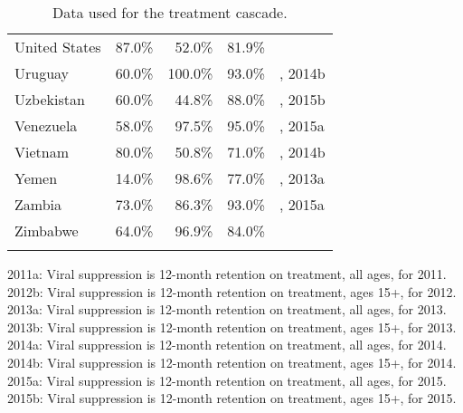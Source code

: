 \begin{longtable}{lrrrl}
 United States & 87.0\% & 52.0\% & 81.9\% & \cite{cdc2012a,cdc2014} \\
  Uruguay & 60.0\% & 100.0\% & 93.0\% & \cite{Unaids2016-an}, 2014b \\
  Uzbekistan & 60.0\% & 44.8\% & 88.0\% & \cite{Unaids2016-an}, 2015b \\
  Venezuela & 58.0\% & 97.5\% & 95.0\% & \cite{Unaids2016-an}, 2015a \\
  Vietnam & 80.0\% & 50.8\% & 71.0\% & \cite{Unaids2016-an}, 2014b \\
  Yemen & 14.0\% & 98.6\% & 77.0\% & \cite{Unaids2016-an}, 2013a \\
  Zambia & 73.0\% & 86.3\% & 93.0\% & \cite{Unaids2016-an}, 2015a \\
  Zimbabwe & 64.0\% & 96.9\% & 84.0\% & \cite{Unaids2016-an} \\
  \hline
  \caption{Data used for the treatment cascade.}
  \label{data_source_treatment_cascade}
\end{longtable}
2011a: Viral suppression is 12-month retention on treatment, all ages, for 2011. \\
2012b: Viral suppression is 12-month retention on treatment, ages 15+, for 2012. \\
2013a: Viral suppression is 12-month retention on treatment, all ages, for 2013. \\
2013b: Viral suppression is 12-month retention on treatment, ages 15+, for 2013. \\
2014a: Viral suppression is 12-month retention on treatment, all ages, for 2014. \\
2014b: Viral suppression is 12-month retention on treatment, ages 15+, for 2014. \\
2015a: Viral suppression is 12-month retention on treatment, all ages, for 2015. \\
2015b: Viral suppression is 12-month retention on treatment, ages 15+, for 2015. \\
